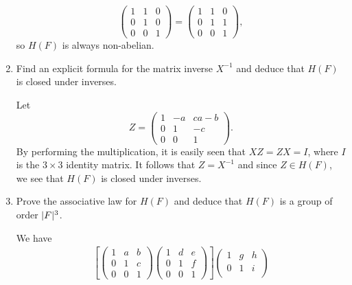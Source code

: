 \begin{enumerate}
\begin{solution}
\begin{equation*}
      \begin{pmatrix}
        1 & 1 & 0 \\
        0 & 1 & 0 \\
        0 & 0 & 1
      \end{pmatrix}
      =
      \begin{pmatrix}
        1 & 1 & 0 \\
        0 & 1 & 1 \\
        0 & 0 & 1
      \end{pmatrix},
    \end{equation*}
    so $H(F)$ is always non-abelian.
  \end{solution}
\item Find an explicit formula for the matrix inverse $X^{-1}$ and
  deduce that $H(F)$ is closed under inverses.
  \begin{solution}
    Let
    \begin{equation*}
      Z =
      \begin{pmatrix}
        1 & -a & ca - b \\
        0 & 1 & -c \\
        0 & 0 & 1
      \end{pmatrix}.
    \end{equation*}
    By performing the multiplication, it is easily seen that
    $XZ = ZX = I$, where $I$ is the $3\times3$ identity matrix. It
    follows that $Z = X^{-1}$ and since $Z\in H(F)$, we see that
    $H(F)$ is closed under inverses.
  \end{solution}
\item Prove the associative law for $H(F)$ and deduce that $H(F)$ is a
  group of order $\lvert{F}\rvert^3$.
  \begin{solution}
    We have
    \begin{multline*}
      \left[
        \begin{pmatrix}
          1 & a & b \\
          0 & 1 & c \\
          0 & 0 & 1
        \end{pmatrix}
        \begin{pmatrix}
          1 & d & e \\
          0 & 1 & f \\
          0 & 0 & 1
        \end{pmatrix}
      \right]
      \begin{pmatrix}
        1 & g & h \\
        0 & 1 & i \\

\end{pmatrix}
\end{multline*}
\end{solution}
\end{enumerate}
